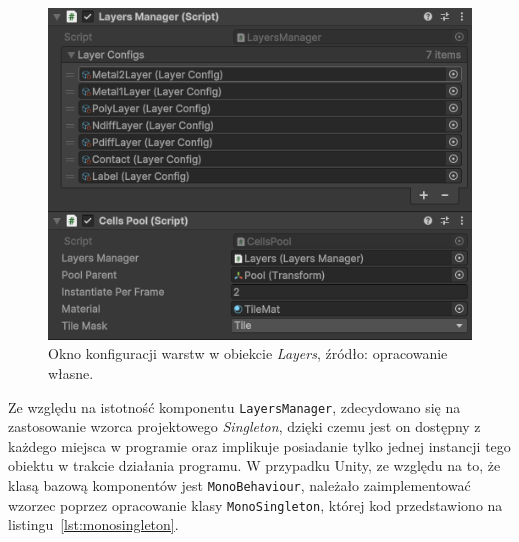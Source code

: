 \begin{figure}[h]
    \centering
    \includegraphics[width=.9\textwidth]{chapters/chapter4/rys/layers}
    \caption[Okno konfiguracji warstw w obiekcie \textit{Layers}.]
    {Okno konfiguracji warstw w obiekcie \textit{Layers}, źródło: opracowanie własne.}
    \label{fig:layers}
\end{figure}

\newpage %

Ze względu na istotność komponentu \texttt{LayersManager}, zdecydowano się na zastosowanie wzorca projektowego \textit{Singleton},
dzięki czemu jest on dostępny z każdego miejsca w programie
oraz implikuje posiadanie tylko jednej instancji tego obiektu w trakcie działania programu.
W przypadku Unity, ze względu na to, że klasą bazową komponentów jest \texttt{MonoBehaviour},
należało zaimplementować wzorzec poprzez opracowanie klasy \texttt{MonoSingleton},
której kod przedstawiono na listingu~\ref{lst:monosingleton}.


